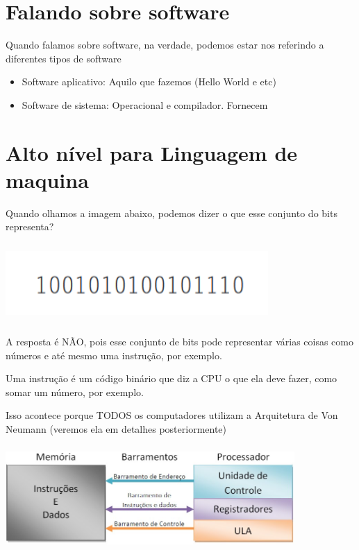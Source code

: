 \documentclass[12pt,a4paper]{report}
\begin{document}
	
	\section{Falando sobre software}
	
	Quando falamos sobre software, na verdade, podemos estar nos referindo a diferentes tipos de software
	
	\begin{itemize}
		\item Software aplicativo: Aquilo que fazemos (Hello World e etc)
		\item Software de sistema: Operacional e compilador. Fornecem
	\end{itemize}
	
	\section{Alto nível para Linguagem de maquina}
	
	Quando olhamos a imagem abaixo, podemos dizer o que esse conjunto do bits representa?
	
	\begin{center}
		
		\includegraphics[width=10cm,height=3cm,keepaspectratio=false]{imagens-teoria/os_bits.png}
		
	\end{center}
	
	A resposta é NÃO, pois esse conjunto de bits pode representar várias coisas como números e até mesmo uma instrução, por exemplo.
	
	Uma instrução é um código binário que diz a CPU o que ela deve fazer, como somar um número, por exemplo.
	
	Isso acontece porque TODOS os computadores utilizam a Arquitetura de Von Neumann (veremos ela em detalhes posteriormente)

	\begin{center}
		
		\includegraphics[width=11cm,height=4cm,keepaspectratio=false]{imagens-teoria/von-neumann.jpeg}
		
	\end{center}
\end{document}
